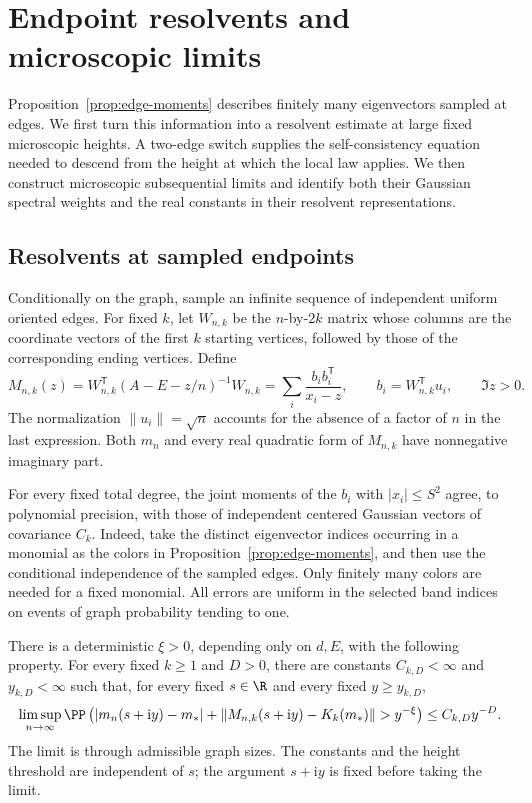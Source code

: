 \section{Endpoint resolvents and microscopic limits}\label{sec:limits}

Proposition~\ref{prop:edge-moments} describes finitely many eigenvectors
sampled at edges. We first turn this information into a resolvent estimate
at large fixed microscopic heights. A two-edge switch supplies the
self-consistency equation needed to descend from the height at which the
local law applies. We then construct microscopic subsequential limits and
identify both their Gaussian spectral weights and the real constants in
their resolvent representations.

\subsection{Resolvents at sampled endpoints}

Conditionally on the graph, sample an infinite sequence of independent
uniform oriented edges. For fixed \(k\), let \(W_{n,k}\) be the \(n\)-by-\(2k\)
matrix whose columns are the coordinate vectors of the first \(k\)
starting vertices, followed by those of the corresponding ending
vertices. Define
\begin{equation}\label{eq:lim-endpoint-resolvent}
 M_{n,k}(z)
 =W_{n,k}^{\mathsf T}(A-E-z/n)^{-1}W_{n,k}
 =\sum_i\frac{b_i b_i^{\mathsf T}}{x_i-z},
 \qquad b_i=W_{n,k}^{\mathsf T}u_i,\qquad \Im z>0.
\end{equation}
The normalization \(\|u_i\|=\sqrt n\) accounts for the absence of a factor
of \(n\) in the last expression. Both \(m_n\) and every real quadratic
form of \(M_{n,k}\) have nonnegative imaginary part.

For every fixed total degree, the joint moments of the \(b_i\) with
\(|x_i|\le S^2\) agree, to polynomial precision, with those of independent
centered Gaussian vectors of covariance \(C_k\). Indeed, take the distinct
eigenvector indices occurring in a monomial as the colors in
Proposition~\ref{prop:edge-moments}, and then use the conditional
independence of the sampled edges. Only finitely many colors are needed
for a fixed monomial. All errors are uniform in the selected band
indices on events of graph probability tending to one.

\begin{proposition}\label{prop:endpoint-control}
There is a deterministic \(\xi>0\), depending only on \(d,E\), with the
following property. For every fixed \(k\ge1\) and \(D>0\), there are
constants \(C_{k,D}<\infty\) and \(y_{k,D}<\infty\) such that, for every
fixed \(s\in\R\) and every fixed \(y\ge y_{k,D}\),
\begin{equation}\label{eq:lim-endpoint-control}
 \limsup_{n\to\infty}
 \PP\left(
 |m_n(s+\mathrm i y)-m_*|
 +\|M_{n,k}(s+\mathrm i y)-K_k(m_*)\|>y^{-\xi}
 \right)
 \le C_{k,D}y^{-D}.
\end{equation}
The limit is through admissible graph sizes. The constants and the height
threshold are independent of \(s\); the argument \(s+\mathrm i y\) is
fixed before taking the limit.
\end{proposition}

